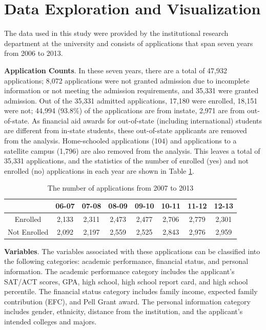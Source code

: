 \documentclass[12pt,english]{report}
\begin{document}
\section{Data Exploration and Visualization}
The data used in this study were provided by the institutional research department at the  university and consists of  applications that span seven years from 2006 to 2013. 

\noindent \textbf{Application Counts}. In these seven years, there are a total of 47,932 applications; 8,072 applications were not granted admission due to incomplete information or not meeting the admission requirements, and 35,331 were granted admission. Out of the 35,331 admitted applications, 17,180 were enrolled, 18,151 were not; 44,994 (93.8\%) of the applications are from instate, 2,971 are from out-of-state. As financial aid awards for out-of-state (including international) students are different from in-state students, these out-of-state applicants are removed from the analysis. Home-schooled applications (104) and applications to a satellite campus (1,796) are also removed from the analysis. This leaves a total of 35,331 applications, and the statistics of the number of enrolled (yes) and not enrolled (no) applications in each year are shown in Table \ref{enroll_year_sum}.

\begin{table}[H]
\centering
\begin{tabular}{|c|c|c|c|c|c|c|c|} \hline
          & 06-07 & 07-08 & 08-09 & 09-10 & 10-11 & 11-12 & 12-13 \\ \hline
Enrolled  & 2,133  & 2,311  & 2,473  & 2,477  & 2,706  & 2,779  & 2,301  \\ \hline
Not Enrolled   & 2,092  & 2,197  & 2,559  & 2,525  & 2,843  & 2,976  & 2,959\\ \hline
\end{tabular}
\caption{The number of applications from 2007 to 2013}
\label{enroll_year_sum}
\end{table}

\vspace{0.15in}
\noindent \textbf{Variables}. The variables associated with these applications can be classified into the following categories: academic performance, financial status, and personal information. The academic performance category includes the applicant's SAT/ACT  scores, GPA, high school, high school report card, and high school percentile. The  financial status category includes family income, expected family contribution (EFC), and Pell Grant award. The personal information category includes gender,  ethnicity, distance from the institution, and the applicant's intended colleges and majors.
\end{document}
